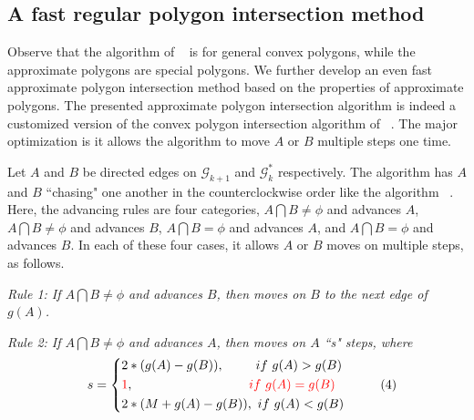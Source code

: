 
\subsection{A fast regular polygon intersection method}


Observe that the algorithm of ~\cite{ORourke:Intersection} is for general convex polygons, while the approximate polygons are special polygons. We further develop an even fast approximate polygon intersection method based on the properties of approximate polygons.
%
The presented approximate polygon intersection algorithm is indeed a customized version of the convex polygon intersection algorithm of ~\cite{ORourke:Intersection}. The major optimization is it allows the algorithm to move $A$ or $B$ multiple steps one time.
%


Let $A$ and $B$ be directed edges on $\mathcal{G}_{k+1}$ and $\mathcal{G}^*_k$ respectively. The algorithm has $A$ and $B$ ``chasing" one another in the counterclockwise order like the algorithm ~\cite{ORourke:Intersection}.
%
Here, the advancing rules are four categories, \ie $A \bigcap B \ne \phi$ and advances $A$, $A \bigcap B \ne \phi$ and advances $B$, $A \bigcap B = \phi$ and advances $A$, and $A \bigcap B = \phi$ and advances $B$.
%
In each of these four cases, it allows $A$ or $B$ moves on multiple steps, as follows.



\emph{Rule 1: 
If $A \bigcap B \ne \phi$ and advances $B$, then moves on $B$ to the next edge of $g(A)$.}




\emph{Rule 2: 
If $A \bigcap B \ne \phi$ and advances $A$, then moves on $A$ ``s" steps, where}
\vspace{-1ex}
\begin{equation*}
\small
\label{equ-rule1}
    \hspace{2ex} s =  \left\{
    \begin{aligned}
        & 2*(g(A) - g(B)),  \hspace{5ex} ~if  ~g(A) > g(B) \\
        & \textcolor[rgb]{1.00,0.00,0.00}{1}, \hspace{21ex}\textcolor[rgb]{1.00,0.00,0.00}{if  ~g(A) = g(B)} \\
        & 2*(M+g(A) - g(B)), ~if  ~g(A) < g(B) \\
    \end{aligned}
    \right.       \hspace{6ex}(4)
\end{equation*}
\vspace{-1ex}



